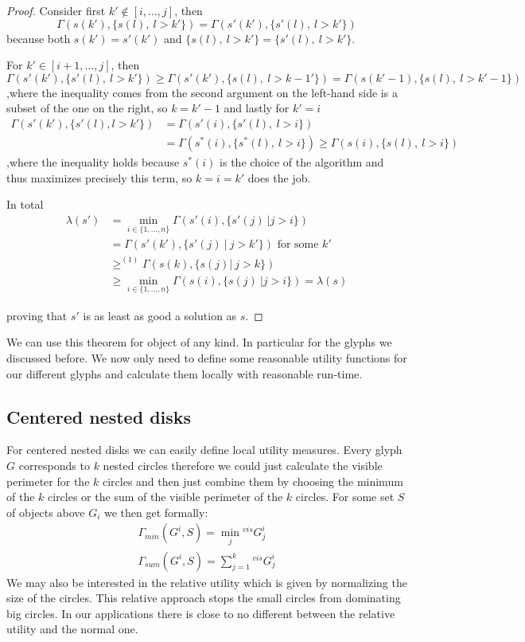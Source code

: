 \documentclass[a4paper,11pt]{article}
\begin{document}
\begin{proof}
Consider first $k'\notin [i,\dots,j]$, then
\[\Gamma(s(k'),\{s(l),\ l>k'\}) = \Gamma(s'(k'),\{s'(l),\ l>k'\})\]
because both $s(k')=s'(k')$ and $\{s(l),\ l>k'\}=\{s'(l),\ l>k'\}$.

For $k'\in [i+1,\dots,j]$, then
\[ \Gamma(s'(k'),\{s'(l),\ l>k'\}) \geq \Gamma(s'(k'),\{s(l),\ l>k-1'\}) = \Gamma(s(k'-1),\{s(l),\ l>k'-1\})\]
,where the inequality comes from the second argument on the left-hand side is a subset of the one on the right, so $k=k'-1$ and lastly for $k'=i$
\begin{equation*}
\begin{split}
\Gamma(s'(k'),\{s'(l), l>k'\}) &= \Gamma(s'(i),\{s'(l),\ l>i\})\\
&=\Gamma(s^*(i),\{s^*(l),\ l>i\})\geq\Gamma(s(i),\{s(l),\ l>i\})
\end{split}
\end{equation*}
,where the inequality holds because $s^*(i)$ is the choice of the algorithm and thus maximizes precisely this term, so $k=i=k'$ does the job.

In total 
\begin{equation*}
\begin{split}
    \lambda(s') &=  \min_{i \in \{1,\dots,n\}} \Gamma(s'(i), \{s'(j)\ | j > i\})\\
    &= \Gamma(s'(k'), \{s'(j)\ |\ j > k'\}) \text{ for some }k'\\
    &\geq^{(1)} \Gamma(s(k), \{s(j)|\ j>k \})\\
    &\geq \min_{i \in \{1,\dots,n\}} \Gamma(s(i), \{s(j)\ | j > i\}) = \lambda(s)
\end{split}
\end{equation*}

proving that $s'$ is as least as good a solution as $s$.
\end{proof}

We can use this theorem for object of any kind. In particular for the glyphs we discussed before. We now only need to define some reasonable utility functions for our different glyphs and calculate them locally with reasonable run-time.

\subsection{Centered nested disks}
For centered nested disks we can easily define local utility measures. Every glyph $G$ corresponds to $k$ nested circles therefore we could just calculate the visible perimeter for the $k$ circles and then just combine them by choosing the minimum of the $k$ circles or the sum of the visible perimeter of the $k$ circles. For some set $S$ of objects above $G_i$ we then get formally:
\begin{align*}
  \Gamma_{min}({G^i,S})=\min_j  {^{vis} G^i_j} \\
  \Gamma_{sum}({G^i,S})=\sum_{j=1}^k  {^{vis} G^i_j}
\end{align*}
We may also be interested in the relative utility which is given by normalizing the size of the circles. This relative approach stops the small circles from dominating big circles. In our applications there is close to no different between the relative utility and the normal one. \\
\end{document}
